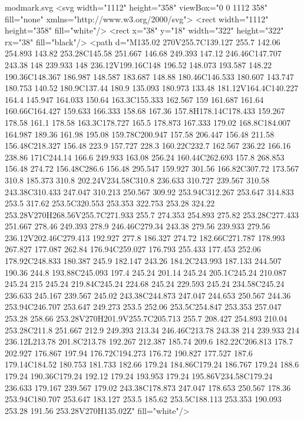 \begin{filecontents}[noheader]{modmark.svg}
<svg width="1112" height="358" viewBox="0 0 1112 358" fill="none" xmlns="http://www.w3.org/2000/svg">
	<rect width="1112" height="358" fill="white"/>
	<rect x="38" y="18" width="322" height="322" rx="38" fill="black"/>
	<path d="M135.02 270V255.7C139.127 255.7 142.06 254.893 143.82 253.28C145.58 251.667 146.68 249.393 147.12 246.46C147.707 243.38 148 239.933 148 236.12V199.16C148 196.52 148.073 193.587 148.22 190.36C148.367 186.987 148.587 183.687 148.88 180.46C146.533 180.607 143.747 180.753 140.52 180.9C137.44 180.9 135.093 180.973 133.48 181.12V164.4C140.227 164.4 145.947 164.033 150.64 163.3C155.333 162.567 159 161.687 161.64 160.66C164.427 159.633 166.333 158.68 167.36 157.8H178.14C178.433 159.267 178.58 161.1 178.58 163.3C178.727 165.5 178.873 167.333 179.02 168.8C184.007 164.987 189.36 161.98 195.08 159.78C200.947 157.58 206.447 156.48 211.58 156.48C218.327 156.48 223.9 157.727 228.3 160.22C232.7 162.567 236.22 166.16 238.86 171C244.14 166.6 249.933 163.08 256.24 160.44C262.693 157.8 268.853 156.48 274.72 156.48C286.6 156.48 295.547 159.927 301.56 166.82C307.72 173.567 310.8 185.373 310.8 202.24V234.58C310.8 236.633 310.727 239.567 310.58 243.38C310.433 247.047 310.213 250.567 309.92 253.94C312.267 253.647 314.833 253.5 317.62 253.5C320.553 253.353 322.753 253.28 324.22 253.28V270H268.56V255.7C271.933 255.7 274.353 254.893 275.82 253.28C277.433 251.667 278.46 249.393 278.9 246.46C279.34 243.38 279.56 239.933 279.56 236.12V202.46C279.413 192.927 277.8 186.327 274.72 182.66C271.787 178.993 267.827 177.087 262.84 176.94C259.027 176.793 255.433 177.453 252.06 178.92C248.833 180.387 245.9 182.147 243.26 184.2C243.993 187.133 244.507 190.36 244.8 193.88C245.093 197.4 245.24 201.14 245.24 205.1C245.24 210.087 245.24 215 245.24 219.84C245.24 224.68 245.24 229.593 245.24 234.58C245.24 236.633 245.167 239.567 245.02 243.38C244.873 247.047 244.653 250.567 244.36 253.94C246.707 253.647 249.273 253.5 252.06 253.5C254.847 253.353 257.047 253.28 258.66 253.28V270H201.9V255.7C205.713 255.7 208.427 254.893 210.04 253.28C211.8 251.667 212.9 249.393 213.34 246.46C213.78 243.38 214 239.933 214 236.12L213.78 201.8C213.78 192.267 212.387 185.74 209.6 182.22C206.813 178.7 202.927 176.867 197.94 176.72C194.273 176.72 190.827 177.527 187.6 179.14C184.52 180.753 181.733 182.66 179.24 184.86C179.24 186.767 179.24 188.6 179.24 190.36C179.24 192.12 179.24 193.953 179.24 195.86V234.58C179.24 236.633 179.167 239.567 179.02 243.38C178.873 247.047 178.653 250.567 178.36 253.94C180.707 253.647 183.127 253.5 185.62 253.5C188.113 253.353 190.093 253.28 191.56 253.28V270H135.02Z" fill="white"/>

\end{filecontents}
